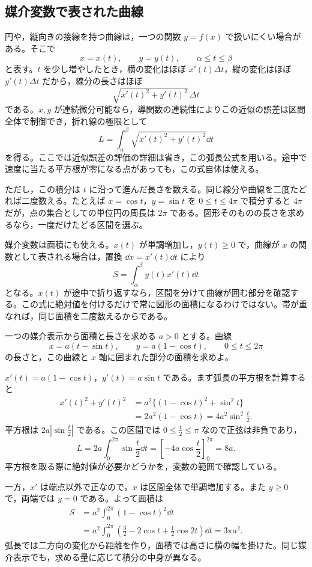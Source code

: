 \subsection{媒介変数で表された曲線}

円や，縦向きの接線を持つ曲線は，一つの関数 $y=f(x)$ で扱いにくい場合がある。そこで
\[
x=x(t),\qquad y=y(t),\qquad \alpha\leq t\leq\beta
\]
と表す。$t$ を少し増やしたとき，横の変化はほぼ $x'(t)\Delta t$，縦の変化はほぼ $y'(t)\Delta t$ だから，線分の長さはほぼ
\[
\sqrt{x'(t)^2+y'(t)^2}\,\Delta t
\]
である。$x,y$ が連続微分可能なら，導関数の連続性によりこの近似の誤差は区間全体で制御でき，折れ線の極限として
\begin{equation}\label{式:媒介曲線の弧長}
L=\int_\alpha^\beta\sqrt{x'(t)^2+y'(t)^2}\dd t
\end{equation}
を得る。ここでは近似誤差の評価の詳細は省き，この弧長公式を用いる。途中で速度に当たる平方根が零になる点があっても，この式自体は使える。

ただし，この積分は $t$ に沿って進んだ長さを数える。同じ線分や曲線を二度たどれば二度数える。たとえば $x=\cos t$，$y=\sin t$ を $0\leq t\leq4\pi$ で積分すると $4\pi$ だが，点の集合としての単位円の周長は $2\pi$ である。図形そのものの長さを求めるなら，一度だけたどる区間を選ぶ。

媒介変数は面積にも使える。$x(t)$ が単調増加し，$y(t)\geq0$ で，曲線が $x$ の関数として表される場合は，置換 $\dd x=x'(t)\dd t$ により
\begin{equation}\label{式:媒介曲線の面積}
S=\int_\alpha^\beta y(t)x'(t)\dd t
\end{equation}
となる。$x(t)$ が途中で折り返すなら，区間を分けて曲線が囲む部分を確認する。この式に絶対値を付けるだけで常に図形の面積になるわけではない。帯が重なれば，同じ面積を二度数えるからである。

\begin{example}{一つの媒介表示から面積と長さを求める}
$a>0$ とする。曲線
\[
x=a(t-\sin t),\qquad y=a(1-\cos t),\qquad 0\leq t\leq2\pi
\]
の長さと，この曲線と $x$ 軸に囲まれた部分の面積を求めよ。
\end{example}

$x'(t)=a(1-\cos t)$，$y'(t)=a\sin t$ である。まず弧長の平方根を計算すると
\[
\begin{aligned}
x'(t)^2+y'(t)^2
 &=a^2\{(1-\cos t)^2+\sin^2t\}\\
 &=2a^2(1-\cos t)=4a^2\sin^2\frac t2.
\end{aligned}
\]
平方根は $2a|\sin\frac t2|$ である。この区間では $0\leq\frac t2\leq\pi$ なので正弦は非負であり，
\[
L=2a\int_0^{2\pi}\sin\frac t2\dd t
 =\left[-4a\cos\frac t2\right]_0^{2\pi}=8a.
\]
平方根を取る際に絶対値が必要かどうかを，変数の範囲で確認している。

一方，$x'$ は端点以外で正なので，$x$ は区間全体で単調増加する。また $y\geq0$ で，両端では $y=0$ である。よって面積は
\[
\begin{aligned}
S&=a^2\int_0^{2\pi}(1-\cos t)^2\dd t\\
 &=a^2\int_0^{2\pi}\left(\frac32-2\cos t+\frac12\cos2t\right)\dd t
 =3\pi a^2.
\end{aligned}
\]
弧長では二方向の変化から距離を作り，面積では高さに横の幅を掛けた。同じ媒介表示でも，求める量に応じて積分の中身が異なる。

